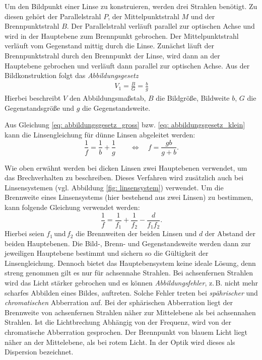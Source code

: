 Um den Bildpunkt einer Linse zu konstruieren, werden drei Strahlen benötigt.
Zu diesen gehört der Parallelstrahl $P$, der Mittelpunktstrahl $M$ und der
Brennpunktstrahl $B$.
Der Parallelstrahl verläuft parallel zur optischen Achse und wird in der Hauptebene
zum Brennpunkt gebrochen. Der Mittelpunktstrahl verläuft vom Gegenstand mittig durch die
Linse. Zunächst läuft der Brennpunktstrahl durch den Brennpunkt der Linse, wird dann
an der Hauptebene gebrochen und verläuft dann parallel zur optischen Achse.
Aus der Bildkonstruktion folgt das \emph{Abbildungsgesetz} %
\begin{align}
  \label{eq: abbildungsgesetz_gross}
  V_1=\frac{B}{G}=\frac{b}{g}
\end{align}
Hierbei beschreibt $V$ den Abbildungsmaßstab, $B$ die Bildgröße, Bildweite $b$, $G$ die Gegenstandsgröße
und $g$ die Gegenstandsweite. %

Aus Gleichung \eqref{eq: abbildungsgesetz_gross} bzw. \eqref{eq: abbildungsgesetz_klein}
kann die Linsengleichung für dünne Linsen abgeleitet werden:
\begin{equation}
  \label{eq: linsengleichung}
  \frac{1}{f}= \frac{1}{b}+  \frac{1}{g} \qquad \Leftrightarrow \quad f= \frac{gb}{g+b}.
\end{equation}

Wie oben erwähnt werden bei dicken Linsen zwei Hauptebenen verwendet, um das Brechverhalten
zu beschreiben. Dieses Verfahren wird zusätzlich auch bei Linsensystemen (vgl. Abbildung \ref{fig: linsensystem}) verwendet. %
Um die Brennweite eines Linsensystems (hier bestehend aus zwei Linsen) zu bestimmen, kann folgende Gleichung verwendet werden:
\begin{equation}
  \label{eq: gleichung_linsensystem}
  \frac{1}{f}=\frac{1}{f_1}+\frac{1}{f_2}-\frac{d}{f_1f_2}.
\end{equation}
Hierbei seien $f_1 \, \text{und} \, f_2$ die Brennweiten der beiden Linsen und $d$ der
Abstand der beiden Hauptebenen.
Die Bild-, Brenn- und Gegenstandsweite werden dann zur jeweiligen Hauptebene
bestimmt und sichern so die Gültigkeit der Linsengleichung.
Dennoch bietet das Hauptebensystem keine ideale Lösung, denn streng genommen
gilt es nur für achsennahe Strahlen. Bei achsenfernen Strahlen wird das Licht stärker
gebrochen und es können \emph{Abbildungsfehler}, z.\,B. nicht mehr scharfes Abbilden eines Bildes,
auftreten. Solche Fehler treten bei \emph{spährischer} und \emph{chromatischen} Abberration auf.
Bei der sphärischen Abberration liegt der Brennweite von achsenfernen Strahlen näher zur
Mittelebene als bei achsennahen Strahlen.
Ist die Lichtbrechung Abhängig von der Frequenz,
wird von der chromatische Abberration gesprochen.
Der Brennpunkt von blauem Licht liegt näher an der Mittelebene, als %
bei rotem Licht. In der Optik wird dieses als Dispersion bezeichnet.

